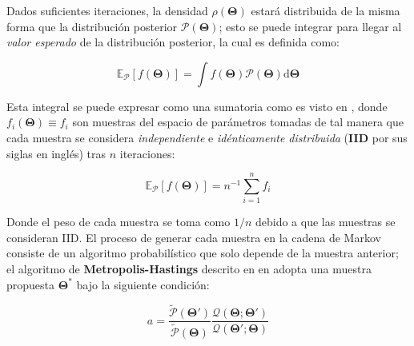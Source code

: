 Dados suficientes iteraciones, la densidad $\rho(\mathbf{\Theta})$ estará
distribuida de la misma forma que la distribución posterior
$\mathcal{P}(\mathbf{\Theta})$; esto se puede integrar para llegar al
\textit{valor esperado} de la distribución posterior, la cual es definida como:

\begin{eqfloat}[!ht]
	\centering
	\begin{equation}
		\mathbb{E}_{\mathcal{P}}\left[f(\mathbf{\Theta})\right] = \int{f(\mathbf{\Theta}) \mathcal{P}(\mathbf{\Theta}) \textrm{d}\mathbf{\Theta}}
	\end{equation}
\end{eqfloat}

Esta integral se puede expresar como una sumatoria como es visto en , donde $f_i(\mathbf{\Theta})
\equiv f_i$ son muestras del espacio de parámetros tomadas de tal manera que
cada muestra se considera \textit{independiente} e \textit{idénticamente
distribuida} (\textbf{IID} por sus siglas en inglés) tras $n$ iteraciones:

\begin{eqfloat}[!ht]
	\centering
	\begin{equation}
		\mathbb{E}_{\mathcal{P}}\left[f(\mathbf{\Theta})\right] = n^{-1} \sum_{i=1}^{n}{f_i}
	\end{equation}
\end{eqfloat}

Donde el peso de cada muestra se toma como $1/n$ debido a que las muestras se
consideran IID. El proceso de generar cada muestra en la cadena de Markov
consiste de un algoritmo probabilístico que solo depende de la muestra anterior;
el algoritmo de \textbf{Metropolis-Hastings} descrito en en
adopta una muestra propuesta $\mathbf{\Theta}^*$ bajo la siguiente condición:

\begin{eqfloat}[!ht]
	\centering
	\begin{equation}
		a = \frac{\tilde{\mathcal{P}}(\mathbf{\Theta}')}{\tilde{\mathcal{P}}(\mathbf{\Theta})} \frac{\mathcal{Q}(\mathbf{\Theta} ; \mathbf{\Theta}')}{\mathcal{Q}(\mathbf{\Theta}' ; \mathbf{\Theta})}
	\end{equation}
\end{eqfloat}

